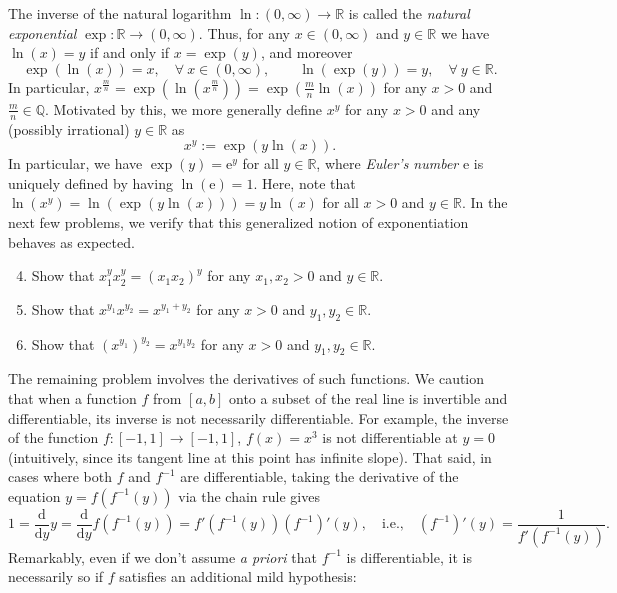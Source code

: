 \documentclass[12 pt,letterpaper]{article}
\newcommand{\bbQ}{\mathbb{Q}}
\newcommand{\bbR}{\mathbb{R}}
\newcommand{\rmd}{\mathrm{d}}
\newcommand{\rme}{\mathrm{e}}
\begin{document}
\noindent
The inverse of the natural logarithm $\ln:(0,\infty)\rightarrow\bbR$ is called the \textit{natural exponential} $\exp:\bbR\rightarrow(0,\infty)$.
Thus, for any $x\in(0,\infty)$ and $y\in\bbR$ we have $\ln(x)=y$ if and only if $x=\exp(y)$, and moreover
\begin{equation*}
\exp(\ln(x))=x,\quad\forall\ x\in(0,\infty),
\qquad
\ln(\exp(y))=y,\quad\forall\ y\in\bbR.
\end{equation*}
In particular,
$x^{\frac{m}{n}}=\exp(\ln(x^{\frac{m}{n}}))=\exp(\frac{m}{n}\ln(x))$ for any $x>0$ and $\frac{m}{n}\in\bbQ$.
Motivated by this, we more generally define $x^y$ for any $x>0$ and any (possibly irrational) $y\in\bbR$ as
\begin{equation*}
x^y:=\exp(y\ln(x)).
\end{equation*}
In particular, we have $\exp(y)=\rme^{y}$ for all $y\in\bbR$,
where \textit{Euler's number} $\rme$ is uniquely defined by having $\ln(\rme)=1$.
Here, note that $\ln(x^y)=\ln(\exp(y\ln(x)))=y\ln(x)$ for all $x>0$ and $y\in\bbR$.
In the next few problems,
we verify that this generalized notion of exponentiation behaves as expected.

\begin{enumerate}
\setcounter{enumi}{3}

\item
Show that $x_1^y x_2^y=(x_1x_2)^y$ for any $x_1,x_2>0$ and $y\in\bbR$.

\item
Show that $x^{y_1}x^{y_2}=x^{y_1+y_2}$ for any $x>0$ and $y_1,y_2\in\bbR$.

\item
Show that $(x^{y_1})^{y_2}=x^{y_1y_2}$ for any $x>0$ and $y_1,y_2\in\bbR$.

\end{enumerate}

\newpage

\noindent
The remaining problem involves the derivatives of such functions.
We caution that when a function $f$ from $[a,b]$ onto a subset of the real line is invertible and differentiable, its inverse is not necessarily differentiable.
For example, the inverse of the function $f:[-1,1]\rightarrow[-1,1]$, $f(x)=x^3$ is not differentiable at $y=0$ (intuitively, since its tangent line at this point has infinite slope).
That said,
in cases where both $f$ and $f^{-1}$ are differentiable,
taking the derivative of the equation $y=f(f^{-1}(y))$ via the chain rule gives
\begin{equation*}
1
=\frac{\rmd}{\rmd y}y
=\frac{\rmd}{\rmd y}f(f^{-1}(y))
=f'(f^{-1}(y))(f^{-1})'(y),
\quad\text{i.e.,}\quad
(f^{-1})'(y)=\frac1{f'(f^{-1}(y))}.
\end{equation*}
Remarkably, even if we don't assume \textit{a priori} that $f^{-1}$ is differentiable,
it is necessarily so if $f$ satisfies an additional mild hypothesis:\bigskip
\end{document}
